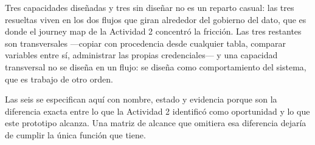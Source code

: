 Tres capacidades diseñadas y tres sin diseñar no es un reparto casual: las tres resueltas viven en
los dos flujos que giran alrededor del gobierno del dato, que es donde el journey map de la
Actividad 2 concentró la fricción. Las tres restantes son transversales ---copiar con procedencia
desde cualquier tabla, comparar variables entre sí, administrar las propias credenciales--- y una
capacidad transversal no se diseña en un flujo: se diseña como comportamiento del sistema, que es
trabajo de otro orden.

Las seis se especifican aquí con nombre, estado y evidencia porque son la diferencia exacta entre
lo que la Actividad 2 identificó como oportunidad y lo que este prototipo alcanza. Una matriz de
alcance que omitiera esa diferencia dejaría de cumplir la única función que tiene.
